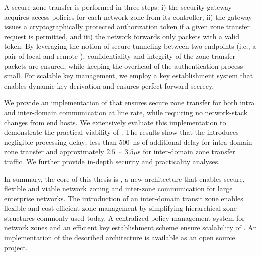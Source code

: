 A secure zone transfer is performed in three steps: i) the security gateway
acquires access policies for each network zone from its controller, ii) the
gateway issues a cryptographically protected authorization token if a given zone
transfer request is permitted, and iii) the network forwards only packets with a
valid token. By leveraging the notion of secure tunneling between two endpoints
(i.e., a pair of local and remote \tps), confidentiality and integrity of the
zone transfer packets are ensured, while keeping the overhead of the
authentication process small. For scalable key management, we employ a key
establishment system that enables dynamic key derivation and ensures perfect
forward secrecy.

We provide an implementation of \name that ensures secure zone transfer for
both intra and inter-domain communication at line rate, while requiring no network-stack
changes from end hosts. We extensively evaluate this implementation to demonstrate
the practical viability of \name. The results show that the \tp introduces negligible
processing delay; less than \SI{500}{ns} of additional delay for intra-domain zone transfer
and approximately $2.5 \sim 3.5 \mu$s for inter-domain zone transfer traffic. We further
provide in-depth security and practicality analyses.


In summary, the core of this thesis is \name, a new architecture that enables secure, flexible
and viable network zoning and inter-zone communication for large enterprise
networks. The introduction of an inter-domain transit zone enables flexible and
cost-efficient zone management by simplifying hierarchical zone structures commonly used
today. A centralized policy management system  for network zones and an efficient key establishment
scheme ensure scalability of \name. An implementation of the described
architecture is available as an open source project.
